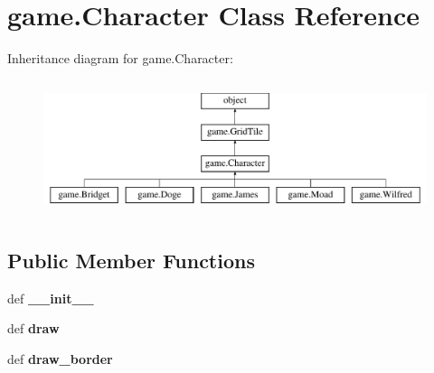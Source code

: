 \hypertarget{classgame_1_1Character}{\section{game.\-Character Class Reference}
\label{classgame_1_1Character}
}
Inheritance diagram for game.\-Character\-:\begin{figure}[H]
\begin{center}
\leavevmode
\includegraphics[height=4.000000cm]{classgame_1_1Character}
\end{center}
\end{figure}
\subsection*{Public Member Functions}
\begin{DoxyCompactItemize}
\item 
\hypertarget{classgame_1_1Character_a06269d574a3caba46fda1ab769bbe11a}{def {\bfseries \-\_\-\-\_\-init\-\_\-\-\_\-}}\label{classgame_1_1Character_a06269d574a3caba46fda1ab769bbe11a}

\item 
\hypertarget{classgame_1_1Character_ab4483704a8c8c8d0c3a2fe92caa13ad6}{def {\bfseries draw}}\label{classgame_1_1Character_ab4483704a8c8c8d0c3a2fe92caa13ad6}

\item 
\hypertarget{classgame_1_1Character_a377f9ea59ab4a461f15064d033577eb5}{def {\bfseries draw\-\_\-border}}\label{classgame_1_1Character_a377f9ea59ab4a461f15064d033577eb5}

\end{DoxyCompactItemize}
